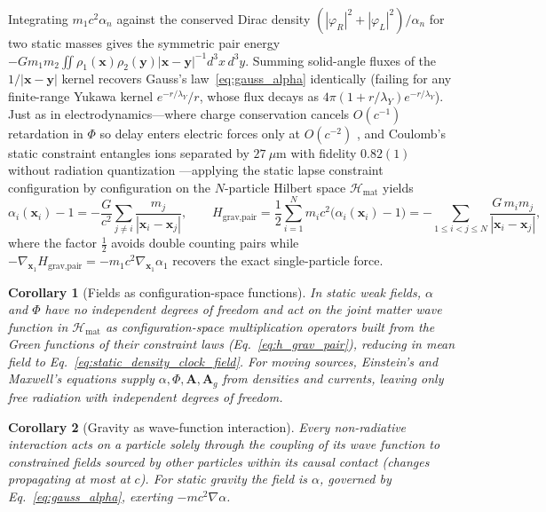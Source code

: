 \documentclass[aps,prd,onecolumn,tightenlines,nofootinbib,notitlepage,10pt,floatfix]{revtex4-2}
\theoremstyle{indentedtheorem}
\newtheorem{corollary}{Corollary}
\begin{document}
Integrating $m_1 c^2\alpha_n$ against the conserved Dirac density $(|\varphi_R|^2+|\varphi_L|^2)/\alpha_n$ for two static masses gives the symmetric pair energy $-Gm_1 m_2\iint\rho_1(\mathbf{x})\rho_2(\mathbf{y})|\mathbf{x}-\mathbf{y}|^{-1}d^3x\,d^3y$. Summing solid-angle fluxes of the $1/|\mathbf{x}-\mathbf{y}|$ kernel recovers Gauss's law~\eqref{eq:gauss_alpha} identically (failing for any finite-range Yukawa kernel $e^{-r/\lambda_Y}/r$, whose flux decays as $4\pi(1+r/\lambda_Y)e^{-r/\lambda_Y}$). Just as in electrodynamics---where charge conservation cancels $O(c^{-1})$ retardation in $\Phi$ so delay enters electric forces only at $O(c^{-2})$ \citep{Jackson1999Classical,LandauLifshitz1975Classical}, and Coulomb's static constraint entangles ions separated by $27~\mu\text{m}$ with fidelity $0.82(1)$ without radiation quantization \citep{Wilson2014Tunable,Anastopoulos2018Comment}---applying the static lapse constraint configuration by configuration on the $N$-particle Hilbert space $\mathcal{H}_\text{mat}$ yields
\begin{equation}
    \alpha_i(\mathbf{x}_i) - 1 = -\frac{G}{c^2}\sum_{j\neq i}\frac{m_j}{|\mathbf{x}_i-\mathbf{x}_j|} , \qquad H_\text{grav,pair} = \frac{1}{2}\sum_{i=1}^{N} m_i c^2\big(\alpha_i(\mathbf{x}_i)-1\big) = -\sum_{1\le i<j\le N}\frac{G\,m_i m_j}{|\mathbf{x}_i-\mathbf{x}_j|} ,
    \label{eq:h_grav_pair}
\end{equation}
where the factor $\tfrac{1}{2}$ avoids double counting pairs while $-\nabla_{\mathbf{x}_1}H_\text{grav,pair}=-m_1 c^2\nabla_{\mathbf{x}_1}\alpha_1$ recovers the exact single-particle force.

\begin{corollary}[Fields as configuration-space functions]\label{cor:fields}
In static weak fields, $\alpha$ and $\Phi$ have no independent degrees of freedom and act on the joint matter wave function in $\mathcal{H}_\text{mat}$ as configuration-space multiplication operators built from the Green functions of their constraint laws (Eq.~\eqref{eq:h_grav_pair}), reducing in mean field to Eq.~\eqref{eq:static_density_clock_field}. For moving sources, Einstein's and Maxwell's equations supply $\alpha,\Phi,\mathbf{A},\mathbf{A}_g$ from densities and currents, leaving only free radiation with independent degrees of freedom.
\end{corollary}

\begin{corollary}[Gravity as wave-function interaction]\label{cor:gravity}
Every non-radiative interaction acts on a particle solely through the coupling of its wave function to constrained fields sourced by other particles within its causal contact (changes propagating at most at $c$). For static gravity the field is $\alpha$, governed by Eq.~\eqref{eq:gauss_alpha}, exerting $-mc^2\nabla\alpha$.
\end{corollary}
\end{document}
